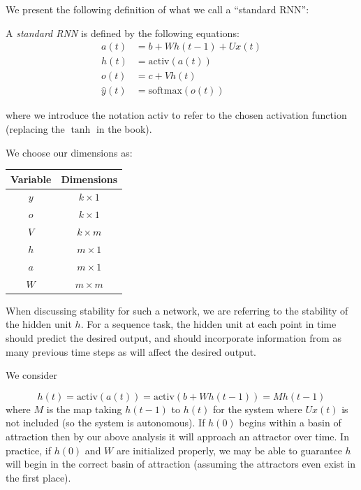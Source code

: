 We present the following definition \cite[p. 381]{Goodfellow-et-al-2016} of what we call a ``standard RNN'':

\begin{definition}
  A \emph{standard RNN} is defined by the following equations:
\begin{align*}
  a(t) & = b + W h(t-1) + U x(t) \\
  h(t) & = \mbox{activ}(a(t)) \\
  o(t) & = c + V h(t) \\
  \widehat{y}(t) & = \mbox{softmax}(o(t))
\end{align*}
\end{definition}

\noindent where we introduce the notation \mbox{activ} to refer to the chosen activation function (replacing the $\tanh$ in the book).

We choose our dimensions as:

\begin{center}
\begin{tabular}{c c}
  Variable & Dimensions \\
  \hline
  $y$ & $k \times 1$ \\
  $o$ & $k \times 1$ \\
  $V$ & $k \times m$ \\
  $h$ & $m \times 1$ \\
  $a$ & $m \times 1$ \\
  $W$ & $m \times m$
\end{tabular}
\end{center}

When discussing stability for such a network, we are referring to the stability of the hidden unit $h$. For a sequence task, the hidden unit at each point in time should predict the desired output, and should incorporate information from as many previous time steps as will affect the desired output.

We consider

\begin{equation*}
h(t) = \mbox{activ}(a(t)) = \mbox{activ}(b + W h(t-1)) = M h(t-1)
\end{equation*}
%
where $M$ is the map taking $h(t - 1)$ to $h(t)$ for the system where $Ux(t)$ is not included (so the system is autonomous). If $h(0)$ begins within a basin of attraction then by our above analysis it will approach an attractor over time. In practice, if $h(0)$ and $W$ are initialized properly, we may be able to guarantee $h$ will begin in the correct basin of attraction (assuming the attractors even exist in the first place).

